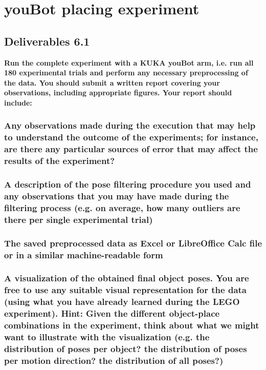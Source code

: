 \chapter{youBot placing experiment}
\section{Deliverables 6.1}
\textbf{Run the complete experiment with a KUKA youBot arm, i.e. run all 180 experimental trials and perform any necessary preprocessing of the data. You should submit a written report covering your observations, including appropriate figures. Your report should include:}

\subsection{Any observations made during the execution that may help to understand the outcome of the experiments; for instance, are there any particular sources of error that may affect the results of the experiment?}


\subsection{A description of the pose filtering procedure you used and any observations that you may have made during the filtering process (e.g. on average, how many outliers are there per single experimental trial)}



\subsection{The saved preprocessed data as Excel or LibreOffice Calc file or in a similar machine-readable form}



\subsection{A visualization of the obtained final object poses. You are free to use any suitable visual representation for the data (using what you have already learned during the LEGO experiment). Hint: Given the different object-place combinations in the experiment, think about what we might want to illustrate with the visualization (e.g. the distribution of poses per object? the distribution of poses per motion direction? the distribution of all poses?)}



